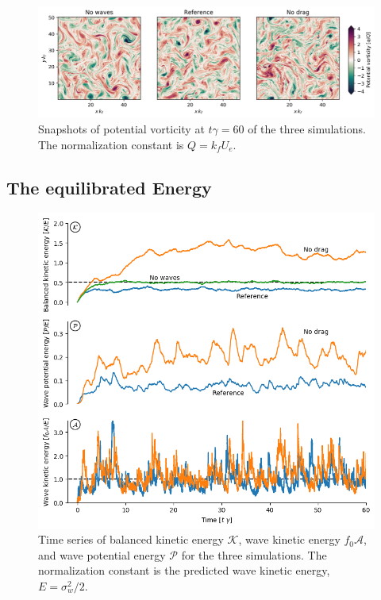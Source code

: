 \documentclass[12pt]{article}
\newcommand{\A}{\mathscr{A}}
\newcommand{\K}{\mathscr{K}}
\renewcommand{\P}{\mathscr{P}}
\newcommand{\?}{\stackrel{?}{=}}
\begin{document}
\begin{figure}
\centering
\includegraphics[width=1.\textwidth]{figs/snapshots_pv_t_60.png}
\caption{Snapshots of potential vorticity at $t\gamma  = 60$ of the three simulations.
          The normalization constant is $Q = k_f U_e$.}
        \label{equilibrated_pv}
\end{figure}



\subsection{The equilibrated Energy}

\begin{figure}
\centering
\includegraphics[width=.825\textwidth]{figs/energies_comparison.png}
\caption{Time series of balanced kinetic energy $\K$,   wave kinetic energy $f_0\A$,
          and wave potential energy $\P$ for the three simulations. The normalization
          constant is the predicted wave kinetic energy, $E = \sigma_w^2/2$.}
        \label{equilibrated_energy}
\end{figure}

%
%

\clearpage

\end{document}
